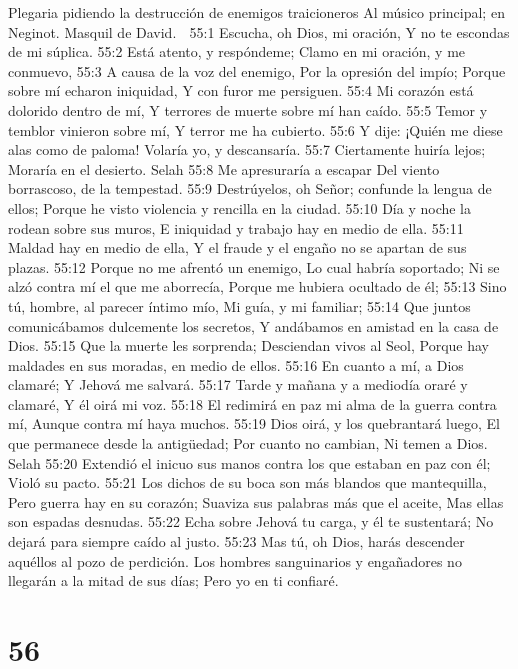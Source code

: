 Plegaria pidiendo la destrucción de enemigos traicioneros 
Al músico principal; en Neginot. Masquil de David. 

55:1 Escucha, oh Dios, mi oración, 
Y no te escondas de mi súplica. 
55:2 Está atento, y respóndeme; 
Clamo en mi oración, y me conmuevo, 
55:3 A causa de la voz del enemigo, 
Por la opresión del impío; 
Porque sobre mí echaron iniquidad, 
Y con furor me persiguen. 
55:4 Mi corazón está dolorido dentro de mí, 
Y terrores de muerte sobre mí han caído. 
55:5 Temor y temblor vinieron sobre mí, 
Y terror me ha cubierto. 
55:6 Y dije: ¡Quién me diese alas como de paloma! 
Volaría yo, y descansaría. 
55:7 Ciertamente huiría lejos; 
Moraría en el desierto. Selah 
55:8 Me apresuraría a escapar 
Del viento borrascoso, de la tempestad. 
55:9 Destrúyelos, oh Señor; confunde la lengua de ellos; 
Porque he visto violencia y rencilla en la ciudad. 
55:10 Día y noche la rodean sobre sus muros, 
E iniquidad y trabajo hay en medio de ella. 
55:11 Maldad hay en medio de ella, 
Y el fraude y el engaño no se apartan de sus plazas. 
55:12 Porque no me afrentó un enemigo, 
Lo cual habría soportado; 
Ni se alzó contra mí el que me aborrecía, 
Porque me hubiera ocultado de él; 
55:13 Sino tú, hombre, al parecer íntimo mío, 
Mi guía, y mi familiar; 
55:14 Que juntos comunicábamos dulcemente los secretos, 
Y andábamos en amistad en la casa de Dios. 
55:15 Que la muerte les sorprenda; 
Desciendan vivos al Seol, 
Porque hay maldades en sus moradas, en medio de ellos. 
55:16 En cuanto a mí, a Dios clamaré; 
Y Jehová me salvará. 
55:17 Tarde y mañana y a mediodía oraré y clamaré, 
Y él oirá mi voz. 
55:18 El redimirá en paz mi alma de la guerra contra mí, 
Aunque contra mí haya muchos. 
55:19 Dios oirá, y los quebrantará luego, 
El que permanece desde la antigüedad; 
Por cuanto no cambian, 
Ni temen a Dios. Selah 
55:20 Extendió el inicuo sus manos contra los que estaban en paz con él; 
Violó su pacto. 
55:21 Los dichos de su boca son más blandos que mantequilla, 
Pero guerra hay en su corazón; 
Suaviza sus palabras más que el aceite, 
Mas ellas son espadas desnudas. 
55:22 Echa sobre Jehová tu carga, y él te sustentará; 
No dejará para siempre caído al justo. 
55:23 Mas tú, oh Dios, harás descender aquéllos al pozo de perdición. 
Los hombres sanguinarios y engañadores no llegarán a la mitad de sus días; 
Pero yo en ti confiaré. 

\chapter{56}

